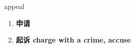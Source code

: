 
\begin{frame}
{\huge appeal}
\begin{center}
\begin{enumerate}\Large
  \item \textbf{申请}
  \item \textbf{起诉 charge with a crime, accuse}
\end{enumerate}
\end{center}
\end{frame}
